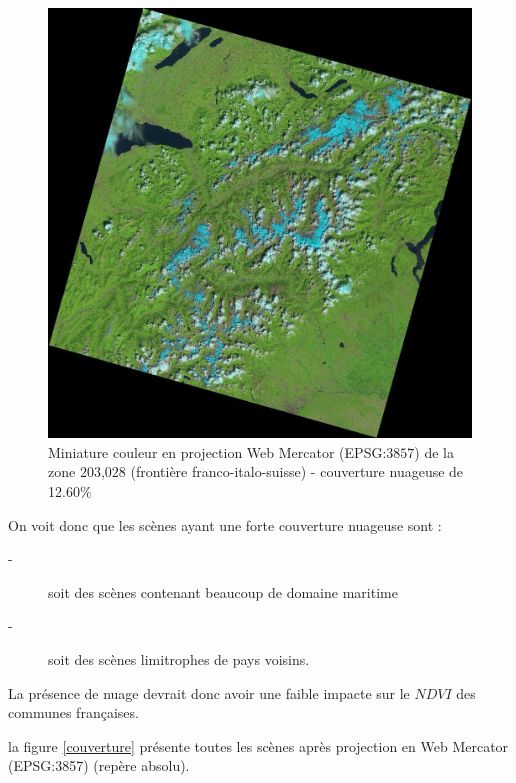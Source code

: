 \documentclass{book}
\begin{document}
\begin{figure}[H]
\begin{center}
\includegraphics[scale=0.2]{images/LC81950282013204LGN00.jpg}
\end{center}
\caption{Miniature couleur en projection Web Mercator (EPSG:$3857$) de la zone $203$,$028$ (frontière franco-italo-suisse) - couverture nuageuse de 12.60\%}
\label{cloud5}
\end{figure}

On voit donc que les scènes ayant une forte couverture nuageuse sont :
\begin{description}
\item[-] soit des scènes contenant beaucoup de domaine maritime
\item[-] soit des scènes limitrophes de pays voisins. 
\end{description}
La présence de nuage devrait donc avoir une faible impacte sur le $NDVI$ des communes françaises.
\clearpage

la figure \ref{couverture} présente toutes les scènes après projection en Web Mercator (EPSG:3857) (repère absolu).
\end{document}
